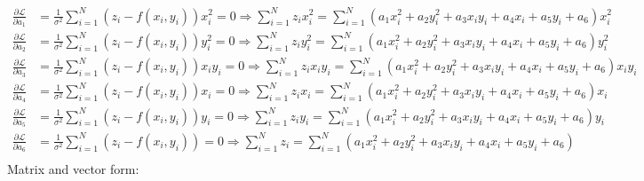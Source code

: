 \documentclass[11pt, fleqn]{article}
\begin{document}
\begin{equation*}
    \begin{split}
        \frac{\partial \mathcal{L}}{\partial a_1} &= \frac{1}{{\sigma^2}}\sum_{i=1}^{N} (z_i - f(x_i,y_i)) x_i^2 = 0 \Longrightarrow \sum_{i=1}^{N} z_i x_i^2 = \sum_{i=1}^{N} (a_1 x_i^2 + a_2 y_i^2 + a_3 x_iy_i + a_4 x_i + a_5 y_i + a_6) x_i^2\\
        \frac{\partial \mathcal{L}}{\partial a_2} &= \frac{1}{{\sigma^2}}\sum_{i=1}^{N} (z_i - f(x_i,y_i)) y_i^2 = 0 \Longrightarrow \sum_{i=1}^{N} z_i y_i^2= \sum_{i=1}^{N} (a_1 x_i^2 + a_2 y_i^2 + a_3 x_iy_i + a_4 x_i + a_5 y_i + a_6) y_i^2\\
        \frac{\partial \mathcal{L}}{\partial a_3} &= \frac{1}{{\sigma^2}}\sum_{i=1}^{N} (z_i - f(x_i,y_i)) x_iy_i = 0 \Longrightarrow \sum_{i=1}^{N} z_i x_iy_i= \sum_{i=1}^{N} (a_1 x_i^2 + a_2 y_i^2 + a_3 x_iy_i + a_4 x_i + a_5 y_i + a_6) x_iy_i\\
        \frac{\partial \mathcal{L}}{\partial a_4} &= \frac{1}{{\sigma^2}}\sum_{i=1}^{N} (z_i - f(x_i,y_i)) x_i = 0 \Longrightarrow \sum_{i=1}^{N} z_i x_i= \sum_{i=1}^{N} (a_1 x_i^2 + a_2 y_i^2 + a_3 x_iy_i + a_4 x_i + a_5 y_i + a_6) x_i\\
        \frac{\partial \mathcal{L}}{\partial a_5} &= \frac{1}{{\sigma^2}}\sum_{i=1}^{N} (z_i - f(x_i,y_i)) y_i = 0 \Longrightarrow \sum_{i=1}^{N} z_i y_i= \sum_{i=1}^{N} (a_1 x_i^2 + a_2 y_i^2 + a_3 x_iy_i + a_4 x_i + a_5 y_i + a_6) y_i\\
        \frac{\partial \mathcal{L}}{\partial a_6} &= \frac{1}{{\sigma^2}}\sum_{i=1}^{N} (z_i - f(x_i,y_i)) = 0 \Longrightarrow \sum_{i=1}^{N} z_i = \sum_{i=1}^{N} (a_1 x_i^2 + a_2 y_i^2 + a_3 x_iy_i + a_4 x_i + a_5 y_i + a_6)\\
    \end{split}
\end{equation*}
Matrix and vector form:
\end{document}
